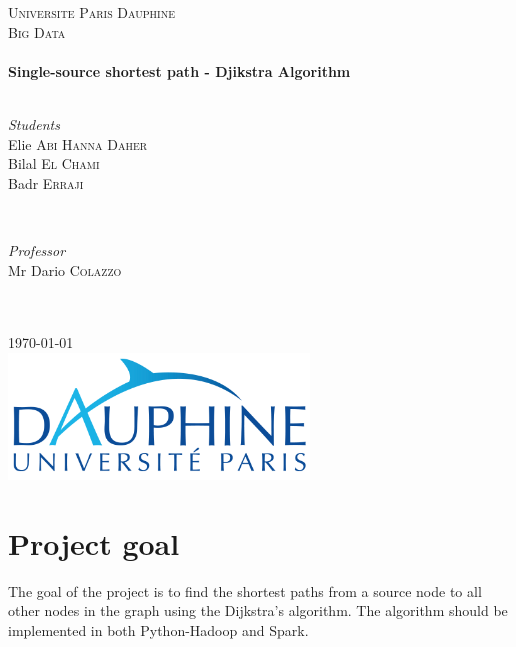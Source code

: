 \documentclass[english]{article}
\begin{document}
\begin{titlepage}
\SetDate[30/01/2018]
\newcommand{\HRule}{\rule{\linewidth}{0.5mm}}
\center 
\textsc{\LARGE Universite Paris Dauphine}\\[1.5cm] 
\textsc{\Large Big Data}\\[0.5cm]
\HRule \\[0.4cm] { \huge \bfseries
Single-source shortest path - Djikstra Algorithm}\\[0.4cm] \HRule \\[1.5cm]
\begin{minipage}{0.4\textwidth}
	\begin{flushleft} \large
		\emph{Students}
		\\ Elie \textsc{Abi Hanna Daher}
		\\ Bilal \textsc{El Chami}
		\\ Badr \textsc{Erraji}
	\end{flushleft}
\end{minipage}
~
\begin{minipage}{0.4\textwidth}
	\begin{flushright} \large
		\emph{Professor} 
		\\ Mr Dario  \textsc{Colazzo}
		\\  \hspace{1cm}
		\\  \hspace{1cm}
	\end{flushright}
\end{minipage}\\[2cm]
{\large \today}\\[2cm]
\includegraphics[width=8cm]{img/dauphine.png}
\vfill
\end{titlepage}
 
\tableofcontents 
\newpage

\section{Project goal}
The goal of the project is to find the shortest paths from a source node to all other nodes in the graph using the Dijkstra’s algorithm. The algorithm should be implemented in both Python-Hadoop and Spark. \\
\end{document}
